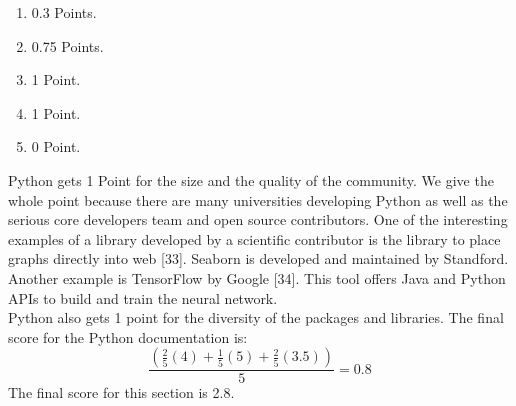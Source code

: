 \documentclass[
  twoside,
  11pt, a4paper,
  footinclude=true,
  headinclude=true,
  cleardoublepage=empty
]{scrreprt}
\begin{document}
    \begin{enumerate}
        \item 0.3 Points.
        \item 0.75 Points.
        \item 1 Point.
        \item 1 Point.
        \item 0 Point.
    \end{enumerate}
    Python gets 1 Point for the size and the quality of the community. We give the whole point because there are many universities developing Python as well as the serious core developers team and open source contributors. One of the interesting examples of a library developed by a scientific contributor is the library to place graphs directly into web [33]. Seaborn is developed and maintained by Standford. Another example is TensorFlow by Google [34]. This tool offers Java and Python APIs to build and train the neural network.\\
    Python also gets 1 point for the diversity of the packages and libraries.
    The final score for the Python documentation is:
    \[ \frac{(\frac{2}{5}(4) + \frac{1}{5}(5) + \frac{2}{5}(3.5) )}{5}= 0.8\]
    The final score for this section is 2.8. 
    
\end{document}
